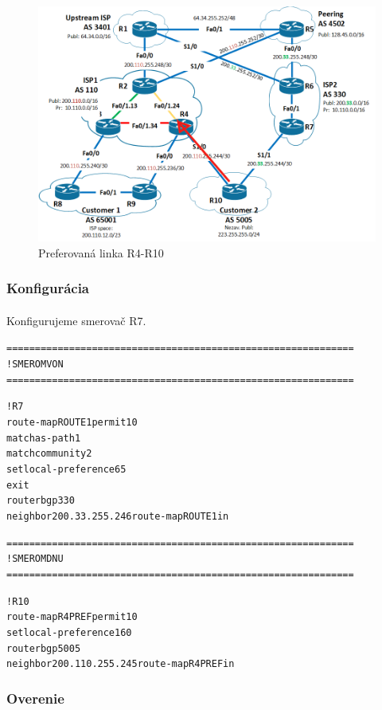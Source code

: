 \documentclass[12pt,twoside,a4paper]{report}
\begin{document}
\begin{figure}[!htbp]
\centering
\includegraphics[width=14cm,keepaspectratio]{bgp_isis_r4_r10_primary}
\caption{Preferovaná linka R4-R10}
\label{fig:bgp_isis_topo}
\end{figure}

\subsubsection{Konfigurácia}
\paragraph{}
Konfigurujeme smerovač R7.

\noindent
{\selectfont
\begin{small}
\begin{alltt}
=============================================================
!SMEROM VON
=============================================================

!R7
route-map ROUTE1 permit 10
  match as-path 1
  match community 2
  set local-preference 65
exit
router bgp 330
neighbor 200.33.255.246 route-map ROUTE1 in


=============================================================
!SMEROM DNU
=============================================================


!R10
route-map R4PREF permit 10
  set local-preference 160
router bgp 5005
  neighbor 200.110.255.245 route-map R4PREF in
\end{alltt}
\end{small}
}


\subsubsection{Overenie}
\end{document}
